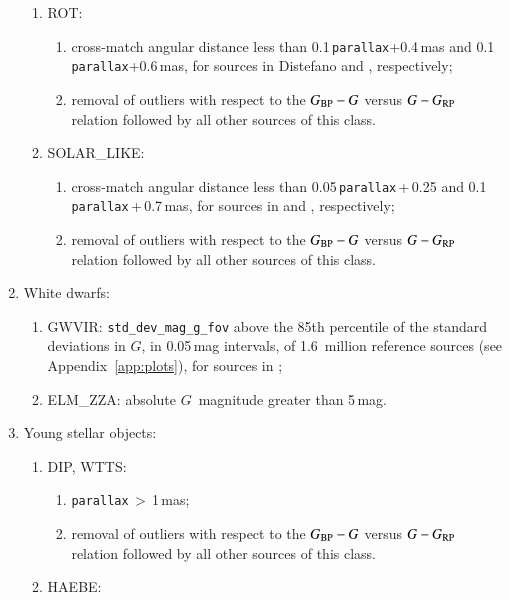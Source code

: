 \documentclass[longauth]{aa}
\def\g{$G$\xspace}
\def\bpg{\mbox{$G_{\rm BP}-G$}\xspace}
\def\grp{\mbox{$G-G_{\rm RP}$}\xspace}
\begin{document}
\begin{appendix}
\begin{enumerate}
\begin{enumerate}
    \item ROT:
      \begin{enumerate}
        \item cross-match angular distance less than 0.1\,\texttt{parallax}+0.4\,mas and 0.1\,\texttt{parallax}+0.6\,mas, for sources in Distefano \citep[catalogue GAIA\_ROT\_GAIA\_2017 in][]{DR3-DPACP-177} and \citet{2006SASS...25...47W}, respectively;
        \item removal of outliers with respect to the \bpg versus \grp relation followed by all other sources of this class.
      \end{enumerate}    
    \item SOLAR\_LIKE:
      \begin{enumerate}
        \item cross-match angular distance less than 0.05\,\texttt{parallax}\,+\,0.25 and 0.1\,\texttt{parallax}\,+\,0.7\,mas, for sources in \citet{2007A&A...469..713M} and \citet{2017ApJ...835...61Z}, respectively;
        \item removal of outliers with respect to the \bpg versus \grp relation followed by all other sources of this class.
      \end{enumerate}        
    \end{enumerate}
    \item White dwarfs:
      \begin{enumerate}
        \item GWVIR: \texttt{std\_dev\_mag\_g\_fov} above the 85th percentile of the  standard deviations in \g, in 0.05\,mag intervals, of 1.6~million reference sources (see Appendix~\ref{app:plots}), for sources in \citet{2020svos.conf...11E};
         \item ELM\_ZZA: absolute \g~magnitude greater than 5\,mag.
      \end{enumerate}        
    \item Young stellar objects:
      \begin{enumerate}
      \item DIP, WTTS:
        \begin{enumerate}
            \item \texttt{parallax}\,$>$\,1\,mas;
            \item removal of outliers with respect to the \bpg versus \grp relation followed by all other sources of this class.
        \end{enumerate}
        \item HAEBE:
        \begin{enumerate}

\end{enumerate}
\end{enumerate}
\end{enumerate}
\end{appendix}
\end{document}
